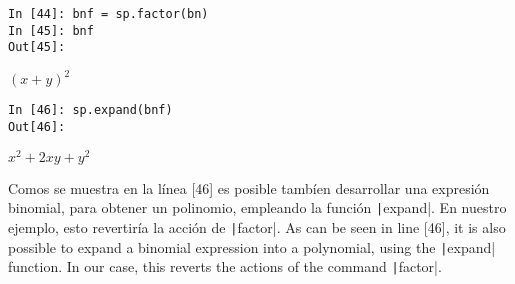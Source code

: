 \begin{center}
	\begin{minipage}{.25\textwidth}
\begin{verbatim}
In [44]: bnf = sp.factor(bn)
In [45]: bnf
Out[45]:
\end{verbatim}
$(x+y)^2$

\begin{verbatim}
In [46]: sp.expand(bnf)
Out[46]:
\end{verbatim}
$x^2+2xy+y^2$
\end{minipage}
\end{center}
\begin{paracol}{2}
Comos se muestra en la línea [46] es posible tambíen desarrollar una expresión binomial, para obtener un polinomio, empleando la función \texttt|expand|. En nuestro ejemplo, esto revertiría la acción de \texttt|factor|.
\switchcolumn
As can be seen in line [46], it is also possible to expand a binomial expression into a polynomial, using the \texttt|expand| function. In our case, this reverts the actions of the command \texttt|factor|.
\end{paracol}

